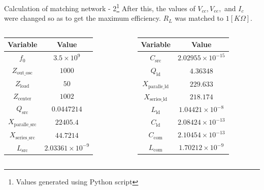 \documentclass{beamer}
\begin{document}
\begin{frame}[fragile]{Calculation of matching network - 2\footnote{Values generated using Python script}}
After this, the values of \(V_{cc}, V_{ee}, \) and \(I_c\) were changed so as to get the maximum efficiency. \(R_L\) was matched to \(1[K\Omega]\).
\begin{columns}
  \begin{table}
    \centering
    \begin{tabular}{|c|c|}
        \hline
        \textbf{Variable} & \textbf{Value} \\
        \hline
        $f_0$ & $3.5 \times 10^9$ \\
        $Z_{\text{out\_osc}}$ & $1000$ \\
        $Z_{\text{load}}$ & $50$ \\
        $Z_{\text{center}}$ & $1002$ \\
        $Q_{\text{src}}$ & $0.0447214$ \\
        $X_{\text{paralle\_src}}$ & $22405.4$ \\
        $X_{\text{series\_src}}$ & $44.7214$ \\
        $L_{\text{src}}$ & $2.03361 \times 10^{-9}$ \\
        \hline
    \end{tabular}
  \end{table} 
  \begin{table}
    \centering
    \begin{tabular}{|c|c|}
        \hline
        \textbf{Variable} & \textbf{Value} \\
        \hline
        $C_{\text{src}}$ & $2.02955 \times 10^{-15}$ \\
        $Q_{\text{ld}}$ & $4.36348$ \\
        $X_{\text{paralle\_ld}}$ & $229.633$ \\
        $X_{\text{series\_ld}}$ & $218.174$ \\
        $L_{\text{ld}}$ & $1.04421 \times 10^{-8}$ \\
        $C_{\text{ld}}$ & $2.08424 \times 10^{-13}$ \\
        $C_{\text{com}}$ & $2.10454 \times 10^{-13}$ \\
        $L_{\text{com}}$ & $1.70212 \times 10^{-9}$ \\
        \hline
    \end{tabular}
  \end{table} 
\end{columns}

\end{frame}
\end{document}
